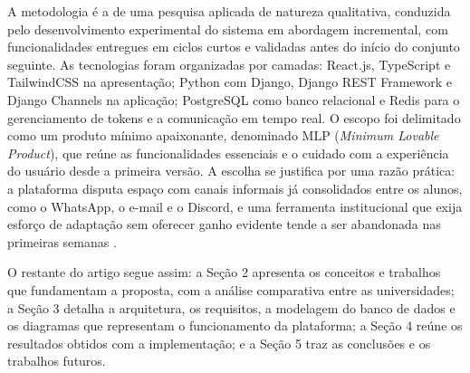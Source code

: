 A metodologia é a de uma pesquisa aplicada de natureza qualitativa, conduzida pelo desenvolvimento experimental do sistema em abordagem incremental, com funcionalidades entregues em ciclos curtos e validadas antes do início do conjunto seguinte. As tecnologias foram organizadas por camadas: React.js, TypeScript e TailwindCSS na apresentação; Python com Django, Django REST Framework e Django Channels na aplicação; PostgreSQL como banco relacional e Redis para o gerenciamento de tokens e a comunicação em tempo real. O escopo foi delimitado como um produto mínimo apaixonante, denominado MLP (\textit{Minimum Lovable Product}), que reúne as funcionalidades essenciais e o cuidado com a experiência do usuário desde a primeira versão. A escolha se justifica por uma razão prática: a plataforma disputa espaço com canais informais já consolidados entre os alunos, como o WhatsApp, o e-mail e o Discord, e uma ferramenta institucional que exija esforço de adaptação sem oferecer ganho evidente tende a ser abandonada nas primeiras semanas \citep{kniberg2016}.

O restante do artigo segue assim: a Seção 2 apresenta os conceitos e trabalhos que fundamentam a proposta, com a análise comparativa entre as universidades; a Seção 3 detalha a arquitetura, os requisitos, a modelagem do banco de dados e os diagramas que representam o funcionamento da plataforma; a Seção 4 reúne os resultados obtidos com a implementação; e a Seção 5 traz as conclusões e os trabalhos futuros.

